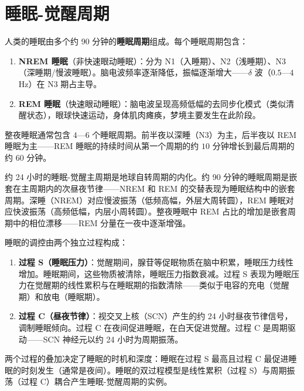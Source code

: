 \section{睡眠-觉醒周期}

\begin{definition}[睡眠的周期结构]\label{def:sleep_cycle}
人类的睡眠由多个约 90 分钟的\textbf{睡眠周期}组成。每个睡眠周期包含：
\begin{enumerate}[label=(\roman*)]
    \item \textbf{NREM 睡眠}（非快速眼动睡眠）：分为 N1（入睡期）、N2（浅睡期）、N3（深睡期/慢波睡眠）。脑电波频率逐渐降低，振幅逐渐增大——$\delta$ 波（$0.5$—$4$ Hz）在 N3 期占主导。
    \item \textbf{REM 睡眠}（快速眼动睡眠）：脑电波呈现高频低幅的去同步化模式（类似清醒状态），眼球快速运动，身体肌肉瘫痪，梦境主要发生在此阶段。
\end{enumerate}
整夜睡眠通常包含 $4$—$6$ 个睡眠周期。前半夜以深睡（N3）为主，后半夜以 REM 睡眠为主——REM 睡眠的持续时间从第一个周期的约 $10$ 分钟增长到最后周期的约 $60$ 分钟。

约 24 小时的睡眠-觉醒主周期是地球自转周期的内化。约 90 分钟的睡眠周期是嵌套在主周期内的次昼夜节律——NREM 和 REM 的交替表现为睡眠结构中的嵌套周期。深睡（NREM）对应慢波振荡（低频高幅，外层大周转圆），REM 睡眠对应快波振荡（高频低幅，内层小周转圆）。整夜睡眠中 REM 占比的增加是嵌套周期中的相位漂移——REM 分量在一夜中逐渐增强。
\end{definition}

\begin{proposition}[睡眠的双过程模型]\label{prop:two_process_sleep}
睡眠的调控由两个独立过程构成：
\begin{enumerate}[label=(\roman*)]
    \item \textbf{过程 S（睡眠压力）}：觉醒期间，腺苷等促眠物质在脑中积累，睡眠压力线性增加。睡眠期间，这些物质被清除，睡眠压力指数衰减。过程 S 表现为睡眠压力在觉醒期的线性累积与在睡眠期的指数清除——类似于电容的充电（觉醒期）和放电（睡眠期）。
    \item \textbf{过程 C（昼夜节律）}：视交叉上核（SCN）产生的约 24 小时昼夜节律信号，调制睡眠倾向。过程 C 在夜间促进睡眠，在白天促进觉醒。过程 C 是周期驱动——SCN 神经元以约 24 小时为周期振荡。
\end{enumerate}
两个过程的叠加决定了睡眠的时机和深度：睡眠在过程 S 最高且过程 C 最促进睡眠的时刻发生（通常是夜间）。睡眠的双过程模型是线性累积（过程 S）与周期振荡（过程 C）耦合产生睡眠-觉醒周期的实例。
\end{proposition}

